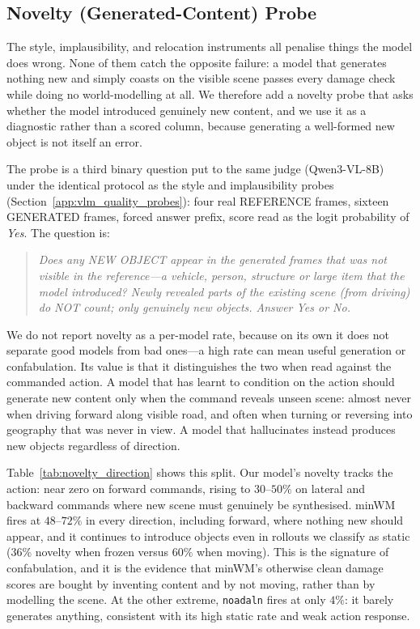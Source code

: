\subsection{Novelty (Generated-Content) Probe}
\label{app:novelty_probe}

The style, implausibility, and relocation instruments all penalise things the
model does wrong. None of them catch the opposite failure: a model that
generates nothing new and simply coasts on the visible scene passes every
damage check while doing no world-modelling at all. We therefore add a novelty
probe that asks whether the model introduced genuinely new content, and we use
it as a diagnostic rather than a scored column, because generating a well-formed
new object is not itself an error.

The probe is a third binary question put to the same judge (Qwen3-VL-8B) under
the identical protocol as the style and implausibility probes
(Section~\ref{app:vlm_quality_probes}): four real REFERENCE frames, sixteen
GENERATED frames, forced answer prefix, score read as the logit probability of
\emph{Yes}. The question is:

\begin{quote}
\small
\emph{Does any NEW OBJECT appear in the generated frames that was not visible in
the reference---a vehicle, person, structure or large item that the model
introduced? Newly revealed parts of the existing scene (from driving) do NOT
count; only genuinely new objects. Answer Yes or No.}
\end{quote}

We do not report novelty as a per-model rate, because on its own it does not
separate good models from bad ones---a high rate can mean useful generation or
confabulation. Its value is that it distinguishes the two when read against the
commanded action. A model that has learnt to condition on the action should
generate new content only when the command reveals unseen scene: almost never
when driving forward along visible road, and often when turning or reversing
into geography that was never in view. A model that hallucinates instead
produces new objects regardless of direction.

Table~\ref{tab:novelty_direction} shows this split. Our model's novelty tracks
the action: near zero on forward commands, rising to $30$--$50\%$ on lateral and
backward commands where new scene must genuinely be synthesised. minWM fires at
$48$--$72\%$ in every direction, including forward, where nothing new should
appear, and it continues to introduce objects even in rollouts we classify as
static ($36\%$ novelty when frozen versus $60\%$ when moving). This is the
signature of confabulation, and it is the evidence that minWM's otherwise clean
damage scores are bought by inventing content and by not moving, rather than by
modelling the scene. At the other extreme, \texttt{noadaln} fires at only $4\%$:
it barely generates anything, consistent with its high static rate and weak
action response.

